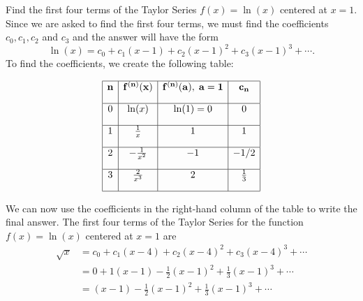 \documentclass{ximera}
\begin{document}
\begin{example} Find the first four terms of the Taylor Series $f(x) = \ln(x)$ centered at $x = 1$.\\
Since we are asked to find the first four terms, we must find the coefficients $c _0, c_1, c_2$ and $c_3$
and the answer will have the form 
\[
\ln(x) = c_0 + c_1(x-1) + c_2(x-1)^2 + c_3(x-1)^3 + \cdots .
\]
To find the coefficients, we create the following table:

\[
\begin{array}{|c|c|c|c|} 
\hline
\bf{n} & \bf{f^{(n)}(x)} & \bf{f^{(n)}(a), \; a = 1} & \bf{c_n} \\[1em] 
\hline
 0 & \ln(x) & \ln(1) = 0 & 0 \\[1em]
\hline
1 & \frac{1}{x} & 1 & 1 \\[1em]
\hline
 2 & -\frac{1}{x^2} & -1  & -1/2 \\[1em]
\hline
 3 & \frac{2}{x^3} & 2 & \frac13\\[1em]
\hline
\end{array}
\]



We can now use the coefficients in the right-hand column of the table to write the final answer. 
The first four terms of the Taylor Series for the function $f(x) = \ln(x)$ centered at $x = 1$ are
\begin{align*}
\sqrt x &= c_0 + c_1(x-4) + c_2(x-4)^2 + c_3(x-4)^3 + \cdots \\
        &= 0 + 1(x-1) -\frac{1}{2}(x-1)^2 + \frac{1}{3}(x-1)^3 + \cdots\\
        &= (x-1) -\frac{1}{2}(x-1)^2 + \frac{1}{3}(x-1)^3 + \cdots
\end{align*}

\end{example}
\end{document}
